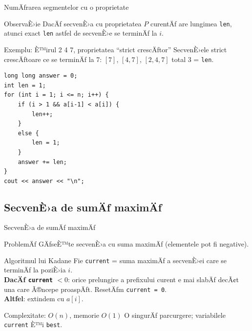 \documentclass{beamer}
\begin{document}
\begin{frame}{NumÄƒrarea segmentelor cu o proprietate}
  \begin{block}{ObservaÈ›ie}
    DacÄƒ secvenÈ›a cu proprietatea $P$ curentÄƒ are lungimea \texttt{len},
    atunci exact \texttt{len} astfel de secvenÈ›e se terminÄƒ la $i$.
  \end{block}
  \begin{block}{Exemplu: È™irul 2 4 7, proprietatea ``strict crescÄƒtor''}
    SecvenÈ›ele strict crescÄƒtoare ce se terminÄƒ la 7:
    $[7]$, $[4,7]$, $[2,4,7]$ \textemdash{} total 3 = \texttt{len}.
  \end{block}
  \begin{lstlisting}
long long answer = 0;
int len = 1;
for (int i = 1; i <= n; i++) {
    if (i > 1 && a[i-1] < a[i]) {
        len++;
    }
    else {
        len = 1;
    }
    answer += len;
}
cout << answer << "\n";
  \end{lstlisting}
\end{frame}

\subsection{SecvenÈ›a de sumÄƒ maximÄƒ}

\begin{frame}{SecvenÈ›a de sumÄƒ maximÄƒ}
  \begin{block}{ProblemÄƒ}
    GÄƒseÈ™te secvenÈ›a cu suma maximÄƒ (elementele pot fi negative).
  \end{block}
  \begin{block}{Algoritmul lui Kadane}
    Fie \texttt{current} = suma maximÄƒ a secvenÈ›ei care se terminÄƒ la poziÈ›ia $i$.\\[3pt]
    \textbf{DacÄƒ \texttt{current} $< 0$}: orice prelungire a prefixului curent e mai slabÄƒ
    decÃ¢t una care Ã®ncepe proaspÄƒt. ResetÄƒm \texttt{current = 0}.\\[3pt]
    \textbf{Altfel}: extindem cu $a[i]$.
  \end{block}
  \begin{block}{Complexitate: $O(n)$, memorie $O(1)$}
    O singurÄƒ parcurgere; variabilele \texttt{current} È™i \texttt{best}.
  \end{block}
\end{frame}
\end{document}
